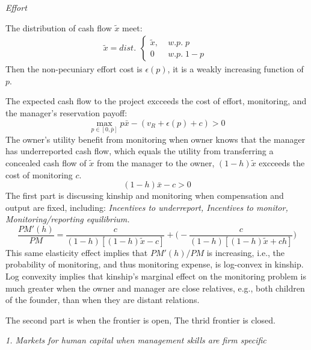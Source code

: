\documentclass{article}
\begin{document}
    \emph{Effort}

    The distribution of cash flow $\tilde{x}$ meet: 
    \begin{equation}
        \tilde{x}=dist.\begin{aligned}
            \begin{cases}
                \tilde{x},\;&w.p.\;p \\
                0\;&w.p.\;1-p
            \end{cases}
        \end{aligned}
    \end{equation}
    Then the non-pecuniary effort cost is $\epsilon(p)$, it is a weakly increasing function of $p$.
   
    The expected cash flow to the project excceeds the cost of effort, monitoring, and the manager's reservation payoff:
    \begin{equation}
        \max_{p\in[0,\bar{p}]} p\bar{x}-(v_R+\epsilon(p)+c)>0
    \end{equation}
    The owner's utility benefit from monitoring when owner knows that the manager has underreported cash flow, 
    which equals the utility from transferring a concealed cash flow of $\tilde{x}$ from 
    the manager to the owner, $(1-h)\tilde{x}$ excceeds the cost of monitoring $c$.
    \begin{equation}
        (1-h)\bar{x}-c>0
    \end{equation}
    The first part is discussing kinship and monitoring when compensation and output are fixed, including:
    \emph{Incentives to underreport, Incentives to monitor, Monitoring/reporting equilibrium.}
    \begin{equation}
        \frac{PM'(h)}{PM}=\frac{c}{(1-h)[(1-h)\tilde{x}-c]}+\bigg(-\frac{c}{(1-h)[(1-h)\tilde{x}+ch]}\bigg)
    \end{equation}
    This same elasticity effect implies that $PM'(h)/PM$ is increasing, i.e., the probability of monitoring, 
    and thus monitoring expense, is log-convex in kinship. Log convexity implies that kinship’s marginal 
    effect on the monitoring problem is much greater when the owner and manager are close relatives, e.g., 
    both children of the founder, than when they are distant relations.
    
    The second part is when the frontier is open, 
    The thrid frontier is closed.
     
    \emph{1. Markets for human capital when management skills are firm specific}
    
\end{document}
